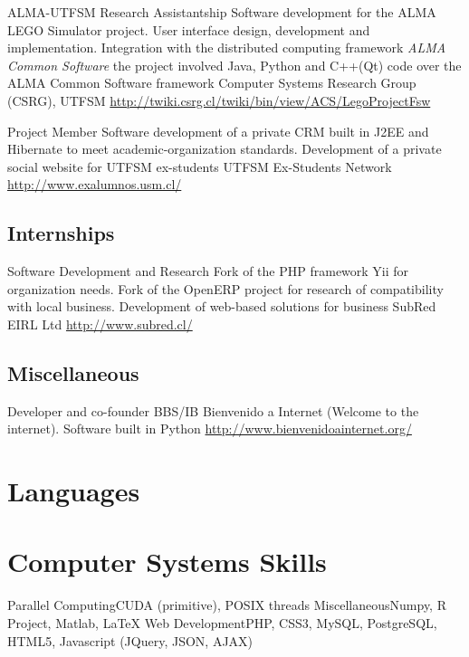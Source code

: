 \documentclass[11pt,a4paper,sans]{moderncv}
\begin{document}
        {ALMA-UTFSM Research Assistantship}
        {Software development for the ALMA LEGO Simulator project. User interface design, development and implementation. Integration with the distributed computing framework \emph{ALMA Common Software}}
        {the project involved Java, Python and C++(Qt) code over the ALMA Common Software framework}
        {Computer Systems Research Group (CSRG), UTFSM}
        {\url{http://twiki.csrg.cl/twiki/bin/view/ACS/LegoProjectFsw}}
        
        {Project Member}
        {Software development of a private CRM built in J2EE and Hibernate to meet academic-organization standards. Development of a private social website for UTFSM ex-students}
        {UTFSM Ex-Students Network}
        {}
        {\url{http://www.exalumnos.usm.cl/}}
        
        
\subsection{Internships}


        {Software Development and Research}
        {Fork of the PHP framework Yii for organization needs. Fork of the OpenERP project for research of compatibility with local business. Development of web-based solutions for business}
        {SubRed EIRL Ltd}
        {}
        {\url{http://www.subred.cl/}}
        
        
\subsection{Miscellaneous}


        {Developer and co-founder}
        {BBS/IB Bienvenido a Internet (Welcome to the internet). Software built in Python}
        {}
        {}
        {\url{http://www.bienvenidoainternet.org/}}
        
\section{Languages}

\section{Computer Systems Skills}
           {Parallel Computing}{CUDA (primitive), POSIX threads}
           {Miscellaneous}{Numpy, R Project, Matlab, \LaTeX}
           {Web Development}{PHP, CSS3, MySQL, PostgreSQL, HTML5, Javascript (JQuery, JSON, AJAX)}
\end{document}

